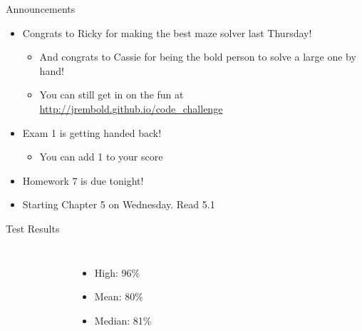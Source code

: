 \documentclass[pdf,aspectratio=169]{beamer}
\title{}
\date{October 17, 2018}
\author{Jed Rembold}
\begin{document}
\renewcommand{\theenumi}{\Alph{enumi}}

\begin{frame}{Announcements}
	\begin{itemize}
		\item Congrats to Ricky for making the best maze solver last Thursday!
			\begin{itemize}
				\item And congrats to Cassie for being the bold person to solve a large one by hand!
				\item You can still get in on the fun at \url{http://jrembold.github.io/code_challenge}
			\end{itemize}
		\item Exam 1 is getting handed back!
			\begin{itemize}
				\item You can add 1 to your score
			\end{itemize}
		\item Homework 7 is due tonight!
		\item Starting Chapter 5 on Wednesday. Read 5.1
	\end{itemize}
\end{frame}

\begin{frame}{Test Results}
  \begin{columns}
	  \begin{figure}[h!]
		\centering
	  \end{figure}
	  \begin{itemize}
		\item High: 96\%
		\item Mean: 80\%
		\item Median: 81\%
	  \end{itemize}
	\end{columns}
\end{frame}
\end{document}
